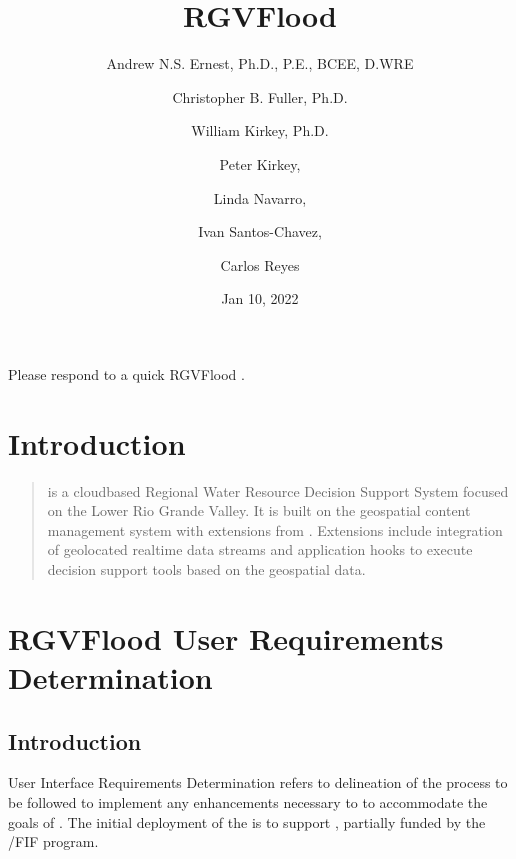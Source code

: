 \documentclass[letterpaper,10pt,english]{sphinxmanual}
\title{RGVFlood}
\date{Jan 10, 2022}
\author{Andrew N.S. Ernest, Ph.D., P.E., BCEE, D.WRE \and Christopher B. Fuller, Ph.D. \and William Kirkey, Ph.D. \and Peter Kirkey, \and Linda Navarro, \and Ivan Santos-Chavez, \and Carlos Reyes}
\begin{document}
\pagestyle{empty}
\sphinxmaketitle
\pagestyle{plain}
\sphinxtableofcontents
\pagestyle{normal}
\label{\detokenize{index::doc}}


\sphinxAtStartPar
Please respond to a quick RGVFlood .


\chapter{Introduction}
\label{\detokenize{introduction:introduction}}\label{\detokenize{introduction::doc}}\begin{quote}

\sphinxAtStartPar
{\hyperref[\detokenize{glossary:term-RGVFlood}]{}} is a cloud\sphinxhyphen{}based Regional Water Resource Decision Support System focused on the Lower Rio Grande Valley. It is built on the  geospatial content management system with extensions from . {\hyperref[\detokenize{glossary:term-REON}]{}} Extensions  include integration of geolocated real\sphinxhyphen{}time data streams and application hooks to execute decision support tools based on the geospatial data.
\end{quote}


\chapter{RGVFlood User Requirements Determination}
\label{\detokenize{requirements/index:rgvflood-user-requirements-determination}}\label{\detokenize{requirements/index::doc}}

\section{Introduction}
\label{\detokenize{requirements/introduction/index:introduction}}\label{\detokenize{requirements/introduction/index::doc}}
\sphinxAtStartPar
User Interface Requirements Determination refers to delineation of the process to be followed to implement any enhancements necessary to {\hyperref[\detokenize{glossary:term-REON.cc}]{}} to accommodate the goals of {\hyperref[\detokenize{glossary:term-REON-WM}]{}}. The initial deployment of the {\hyperref[\detokenize{glossary:term-REON-WM}]{}} is to support {\hyperref[\detokenize{glossary:term-RGVFlood}]{}}, partially funded by the {\hyperref[\detokenize{glossary:term-TWDB}]{}}/FIF program.
\end{document}
